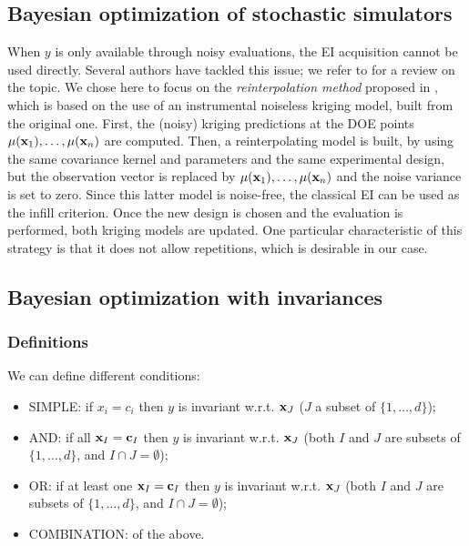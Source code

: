 \subsection{Bayesian optimization of stochastic simulators}
When $y$ is only available through noisy evaluations, the EI acquisition cannot be used directly.
Several authors have tackled this issue; we refer to \cite{picheny2013benchmark} for a review on the topic.
We chose here to focus on the \textit{reinterpolation method} proposed in \cite{forrester2006design}, which is based on the use of an instrumental noiseless kriging model, 
built from the original one. First, the (noisy) kriging predictions at the DOE points $\mu(\mathbf{x}_1), \ldots, \mu(\mathbf{x}_n)$ are computed. 
Then, a reinterpolating model is built, by using the same covariance kernel and parameters and the same experimental design, but
the observation vector is replaced by $\mu(\mathbf{x}_1), \ldots, \mu(\mathbf{x}_n)$ and the noise variance is set to zero. Since this latter model is
noise-free, the classical EI can be used as the infill criterion. Once the new design is chosen and the evaluation is performed,
both kriging models are updated. One particular characteristic of this strategy is that it does not allow repetitions, which is desirable in our
case.

\subsection{Bayesian optimization with invariances}

\subsubsection{Definitions}

We can define different conditions:
\begin{itemize}
 \item SIMPLE: if $x_i = c_i$ then $y$ is invariant w.r.t.  $\mathbf{x}_J$ ($J$ a subset of $\{1, \ldots, d\}$); 
 \item AND: if all $\mathbf{x}_I = \mathbf{c}_I$ then $y$ is invariant w.r.t.  $\mathbf{x}_J$ (both $I$ and $J$ are subsets of $\{1, \ldots, d\}$, and $I \cap J = \emptyset$);
 \item OR: if at least one $\mathbf{x}_I = \mathbf{c}_I$ then $y$ is invariant w.r.t.  $\mathbf{x}_J$ (both $I$ and $J$ are subsets of $\{1, \ldots, d\}$, and $I \cap J = \emptyset$);
 \item COMBINATION: of the above.
\end{itemize}

